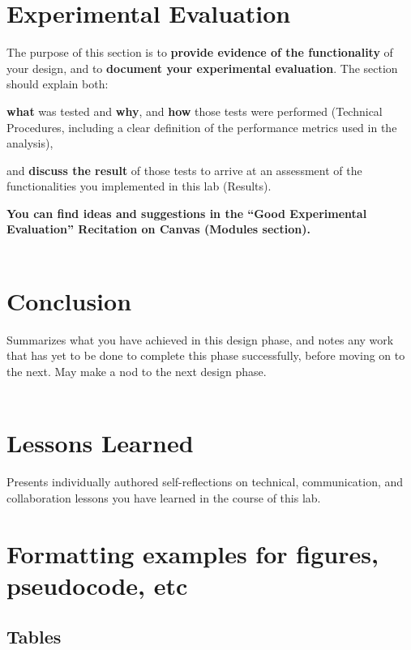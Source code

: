 \documentclass{article}
\begin{document}
\section{Experimental Evaluation}
The purpose of this section is to \textbf{provide evidence of the functionality} of your design, and to \textbf{document your experimental evaluation}. The section should explain both:

\begin{enumerate}
\begin{item}
\textbf{what} was tested and \textbf{why}, and \textbf{how} those tests were performed (Technical Procedures, including a clear definition of the performance metrics used in the analysis),
\end{item}
\begin{item}
and \textbf{discuss the result} of those tests to arrive at an assessment of the functionalities you implemented in this lab (Results).
\end{item}
\end{enumerate}

\textbf{You can find ideas and suggestions in the “Good Experimental Evaluation” Recitation on Canvas (Modules section).}\\\\

\section{Conclusion}
Summarizes what you have achieved in this design phase, and notes any work that has yet to be done to complete this phase successfully, before moving on to the next. May make a nod to the next design phase.\\\\

\section{Lessons Learned}
Presents individually authored self-reflections on technical, communication, and collaboration lessons you have learned in the course of this lab.

\section{Formatting examples for figures, pseudocode, etc}

\subsection{Tables}
\end{document}
